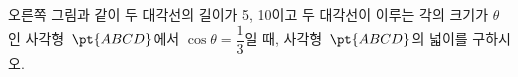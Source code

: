 \noindent\begin{minipage}[t]{0.58\linewidth}\vspace{0pt}\raggedright 오른쪽 그림과 같이 두 대각선의 길이가 5, 10이고 두 대각선이 이루는 각의 크기가 $\theta$인 사각형~$\pt{ABCD}$에서 $\cos\theta=\dfrac{1}{3}$일 때, 사각형~$\pt{ABCD}$의 넓이를 구하시오.\end{minipage}\hfill\begin{minipage}[t]{0.4\linewidth}\vspace{0pt}\centering \resizebox{\ifdim\width>\linewidth\linewidth\else\width\fi}{!}{}\end{minipage}\par
